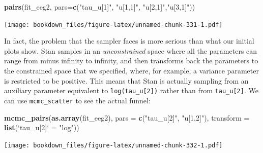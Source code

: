 \documentclass[12pt,]{krantz}
\newenvironment{Shaded}{\begin{snugshade}}{\end{snugshade}}
\newcommand{\KeywordTok}[1]{\textcolor[rgb]{0.13,0.29,0.53}{\textbf{#1}}}
\newcommand{\DataTypeTok}[1]{\textcolor[rgb]{0.13,0.29,0.53}{#1}}
\newcommand{\StringTok}[1]{\textcolor[rgb]{0.31,0.60,0.02}{#1}}
\newcommand{\NormalTok}[1]{#1}
\theoremstyle{definition}
\theoremstyle{definition}
\theoremstyle{definition}
\theoremstyle{remark}
\begin{document}
\begin{Shaded}
\begin{Highlighting}[]
\KeywordTok{pairs}\NormalTok{(fit_eeg2, }\DataTypeTok{pars=}\KeywordTok{c}\NormalTok{(}\StringTok{"tau_u[1]"}\NormalTok{, }\StringTok{"u[1,1]"}\NormalTok{, }\StringTok{"u[2,1]"}\NormalTok{,}\StringTok{"u[3,1]"}\NormalTok{))}
\end{Highlighting}
\end{Shaded}

\texttt{[image: bookdown\_files/figure-latex/unnamed-chunk-331-1.pdf]}

In fact, the problem that the sampler faces is more serious than what
our initial plots show. Stan samples in an \emph{unconstrained} space
where all the parameters can range from minus infinity to infinity, and
then transforms back the parameters to the constrained space that we
specified, where, for example, a variance parameter is restricted to be
positive. This means that Stan is actually sampling from an auxiliary
parameter equivalent to \texttt{log(tau\_u{[}2{]})} rather than from
\texttt{tau\_u{[}2{]}}. We can use \texttt{mcmc\_scatter} to see the
actual funnel:

\begin{Shaded}
\begin{Highlighting}[]
\KeywordTok{mcmc_pairs}\NormalTok{(}\KeywordTok{as.array}\NormalTok{(fit_eeg2), }\DataTypeTok{pars =} \KeywordTok{c}\NormalTok{(}\StringTok{"tau_u[2]"}\NormalTok{, }\StringTok{"u[1,2]"}\NormalTok{),}
           \DataTypeTok{transform =} \KeywordTok{list}\NormalTok{(}\StringTok{`}\DataTypeTok{tau_u[2]}\StringTok{`}\NormalTok{ =}\StringTok{ "log"}\NormalTok{))}
\end{Highlighting}
\end{Shaded}

\texttt{[image: bookdown\_files/figure-latex/unnamed-chunk-332-1.pdf]}
\end{document}
